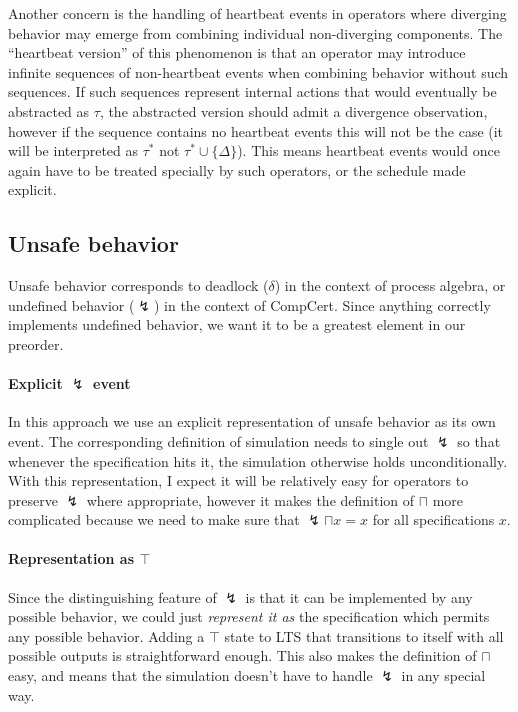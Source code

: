\documentclass[11pt]{article}
\begin{document}
Another concern is the handling of heartbeat events
in operators where diverging behavior may emerge
from combining individual non-diverging components.
The ``heartbeat version'' of this phenomenon
is that an operator may introduce
infinite sequences of non-heartbeat events
when combining behavior
without such sequences.
If such sequences represent
internal actions that would eventually be abstracted as $\tau$,
the abstracted version should admit a divergence observation, however
if the sequence contains no heartbeat events this will not be the case
(it will be interpreted as $\tau^*$ not $\tau^* \cup \{\Delta\}$).
This means heartbeat events would once again
have to be treated specially by such operators,
or the schedule made explicit.


\subsection{Unsafe behavior} %

Unsafe behavior
corresponds to deadlock ($\delta$) in the context of process algebra,
or undefined behavior ($\lightning$) in the context of CompCert.
Since anything correctly implements undefined behavior,
we want it to be a greatest element in our preorder.

\paragraph{Explicit $\lightning$ event}

In this approach we use an explicit representation of
unsafe behavior as its own event.
The corresponding definition of simulation needs to single out $\lightning$
so that whenever the specification hits it,
the simulation otherwise holds unconditionally.
With this representation,
I expect it will be relatively easy
for operators to preserve $\lightning$ where appropriate,
however it makes the definition of $\sqcap$
more complicated because we need to make sure that
$\lightning \sqcap x = x$ for all specifications $x$.

\paragraph{Representation as $\top$}

Since the distinguishing feature of $\lightning$ is that
it can be implemented by any possible behavior,
we could just \emph{represent it as}
the specification which permits any possible behavior.
Adding a $\top$ state to LTS that transitions to itself
with all possible outputs is straightforward enough.
This also makes the definition of $\sqcap$ easy,
and means that the simulation doesn't have to handle $\lightning$
in any special way.
\end{document}
